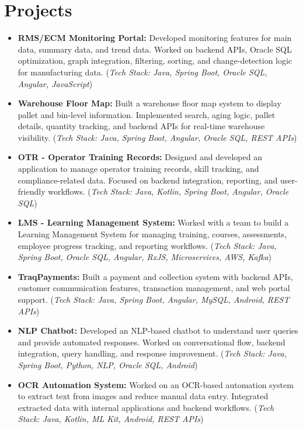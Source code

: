 \documentclass[11pt, a4paper]{article}
\begin{document}
\section*{Projects}
\begin{itemize}[leftmargin=1.5em, itemsep=0.55ex, label=\textbullet]

\item \textbf{RMS/ECM Monitoring Portal:}
Developed monitoring features for main data, summary data, and trend data. Worked on backend APIs, Oracle SQL optimization, graph integration, filtering, sorting, and change-detection logic for manufacturing data.
(\textit{Tech Stack: Java, Spring Boot, Oracle SQL, Angular, JavaScript})

\item \textbf{Warehouse Floor Map:}
Built a warehouse floor map system to display pallet and bin-level information. Implemented search, aging logic, pallet details, quantity tracking, and backend APIs for real-time warehouse visibility.
(\textit{Tech Stack: Java, Spring Boot, Angular, Oracle SQL, REST APIs})

\item \textbf{OTR - Operator Training Records:}
Designed and developed an application to manage operator training records, skill tracking, and compliance-related data. Focused on backend integration, reporting, and user-friendly workflows.
(\textit{Tech Stack: Java, Kotlin, Spring Boot, Angular, Oracle SQL})

\item \textbf{LMS - Learning Management System:}
Worked with a team to build a Learning Management System for managing training, courses, assessments, employee progress tracking, and reporting workflows.
(\textit{Tech Stack: Java, Spring Boot, Oracle SQL, Angular, RxJS, Microservices, AWS, Kafka})

\item \textbf{TraqPayments:}
Built a payment and collection system with backend APIs, customer communication features, transaction management, and web portal support.
(\textit{Tech Stack: Java, Spring Boot, Angular, MySQL, Android, REST APIs})

\item \textbf{NLP Chatbot:}
Developed an NLP-based chatbot to understand user queries and provide automated responses. Worked on conversational flow, backend integration, query handling, and response improvement.
(\textit{Tech Stack: Java, Spring Boot, Python, NLP, Oracle SQL, Android})

\item \textbf{OCR Automation System:}
Worked on an OCR-based automation system to extract text from images and reduce manual data entry. Integrated extracted data with internal applications and backend workflows.
(\textit{Tech Stack: Java, Kotlin, ML Kit, Android, REST APIs})


\end{itemize}
\end{document}
